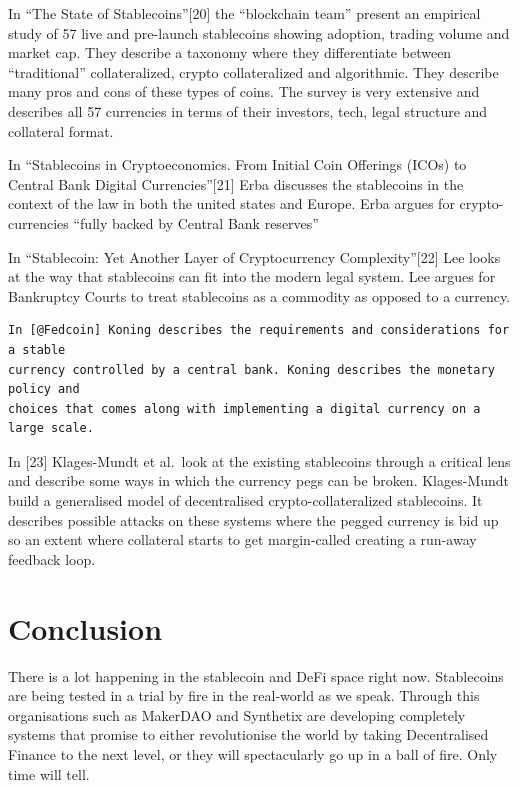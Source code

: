 \documentclass[english,]{IEEEtran}
\begin{document}
In ``The State of Stablecoins''{[}20{]} the ``blockchain team'' present
an empirical study of 57 live and pre-launch stablecoins showing
adoption, trading volume and market cap. They describe a taxonomy where
they differentiate between ``traditional'' collateralized, crypto
collateralized and algorithmic. They describe many pros and cons of
these types of coins. The survey is very extensive and describes all 57
currencies in terms of their investors, tech, legal structure and
collateral format.

In ``Stablecoins in Cryptoeconomics. From Initial Coin Offerings (ICOs)
to Central Bank Digital Currencies''{[}21{]} Erba discusses the
stablecoins in the context of the law in both the united states and
Europe. Erba argues for crypto-currencies ``fully backed by Central Bank
reserves''

In ``Stablecoin: Yet Another Layer of Cryptocurrency
Complexity''{[}22{]} Lee looks at the way that stablecoins can fit into
the modern legal system. Lee argues for Bankruptcy Courts to treat
stablecoins as a commodity as opposed to a currency.

\begin{verbatim}
In [@Fedcoin] Koning describes the requirements and considerations for a stable
currency controlled by a central bank. Koning describes the monetary policy and
choices that comes along with implementing a digital currency on a large scale.
\end{verbatim}

In {[}23{]} Klages-Mundt et al.~look at the existing stablecoins through
a critical lens and describe some ways in which the currency pegs can be
broken. Klages-Mundt build a generalised model of decentralised
crypto-collateralized stablecoins. It describes possible attacks on
these systems where the pegged currency is bid up so an extent where
collateral starts to get margin-called creating a run-away feedback
loop.

\hypertarget{conclusion}{%
\section{Conclusion}\label{conclusion}}

There is a lot happening in the stablecoin and DeFi space right now.
Stablecoins are being tested in a trial by fire in the real-world as we
speak. Through this organisations such as MakerDAO and Synthetix are
developing completely systems that promise to either revolutionise the
world by taking Decentralised Finance to the next level, or they will
spectacularly go up in a ball of fire. Only time will tell.
\end{document}
